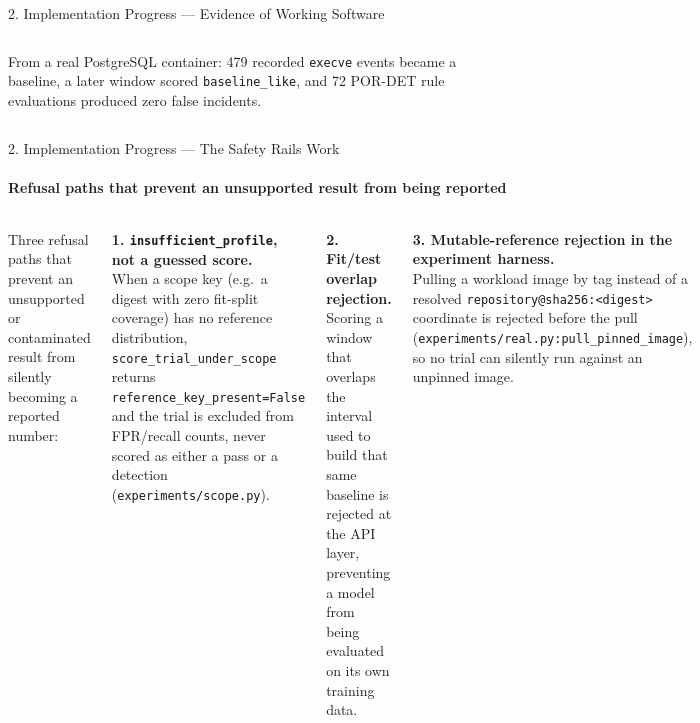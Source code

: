 \documentclass[aspectratio=169, 11pt]{beamer}
\begin{document}
\begin{frame}{2. Implementation Progress --- Evidence of Working Software}
\begin{columns}[T]
\smallskip
{\scriptsize From a real PostgreSQL container: 479 recorded \texttt{execve}
events became a baseline, a later window scored \texttt{baseline\_like}, and
72 POR-DET rule evaluations produced zero false incidents.}
\end{columns}
\end{frame}

\begin{frame}{2. Implementation Progress --- The Safety Rails Work}
\framesubtitle{Refusal paths that prevent an unsupported result from being reported}

\begin{columns}[T]
\footnotesize
Three refusal paths that prevent an unsupported or contaminated result from
silently becoming a reported number:

\medskip
\textbf{1. \texttt{insufficient\_profile}, not a guessed score.}\\
When a scope key (e.g.\ a digest with zero fit-split coverage) has no
reference distribution, \texttt{score\_trial\_under\_scope} returns
\texttt{reference\_key\_present=False} and the trial is excluded from
FPR/recall counts, never scored as either a pass or a detection
(\texttt{experiments/scope.py}).

\medskip
\textbf{2. Fit/test overlap rejection.}\\
Scoring a window that overlaps the interval used to build that same baseline
is rejected at the API layer, preventing a model from being evaluated on its
own training data.

\medskip
\textbf{3. Mutable-reference rejection in the experiment harness.}\\
Pulling a workload image by tag instead of a resolved
\texttt{repository@sha256:<digest>} coordinate is rejected before the pull
(\texttt{experiments/real.py:pull\_pinned\_image}), so no trial can silently
run against an unpinned image.

\centering
{}


\end{columns}
\end{frame}
\end{document}
